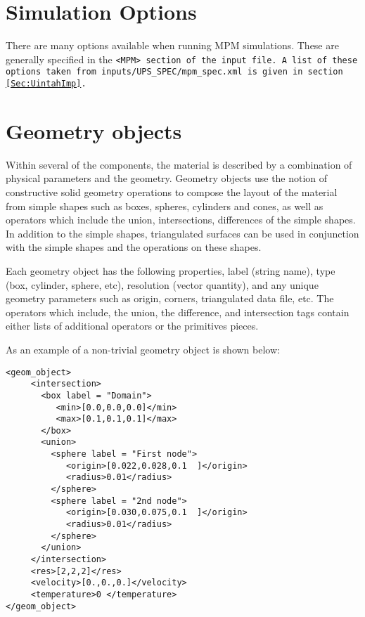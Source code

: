 \section{Simulation Options} \label{Sec:SimulationOptions}


There are many options available when running MPM simulations.  These
are generally specified in the \tt <MPM> \normalfont section of the input file.
A list of these options taken from 
\tt inputs/UPS\_SPEC/mpm\_spec.xml \normalfont  is given in section \ref{Sec:UintahImp}.

\section{Geometry objects} \label{Sec:GeometryObjects}

Within several of the components, the material is described by a
combination of physical parameters and the geometry.  Geometry objects
use the notion of constructive solid geometry operations to compose
the layout of the material from simple shapes such as boxes, spheres,
cylinders and cones, as well as operators which include the union,
intersections, differences of the simple shapes.  In addition to the
simple shapes, triangulated surfaces can be used in conjunction with
the simple shapes and the operations on these shapes.

Each geometry object has the following properties, label (string
name), type (box, cylinder, sphere, etc), resolution (vector
quantity), and any unique geometry parameters such as origin, corners,
triangulated data file, etc.  The operators which include, the union,
the difference, and intersection tags contain either lists of
additional operators or the primitives pieces.

As an example of a non-trivial geometry object is shown below:

\begin{Verbatim}[fontsize=\footnotesize]
<geom_object>
     <intersection>
       <box label = "Domain">
          <min>[0.0,0.0,0.0]</min>
          <max>[0.1,0.1,0.1]</max>
       </box>
       <union>
         <sphere label = "First node">
            <origin>[0.022,0.028,0.1  ]</origin>
            <radius>0.01</radius>
         </sphere>
         <sphere label = "2nd node">
            <origin>[0.030,0.075,0.1  ]</origin>
            <radius>0.01</radius>
         </sphere>
       </union>
     </intersection>
     <res>[2,2,2]</res>
     <velocity>[0.,0.,0.]</velocity>
     <temperature>0 </temperature>
</geom_object>
\end{Verbatim}

